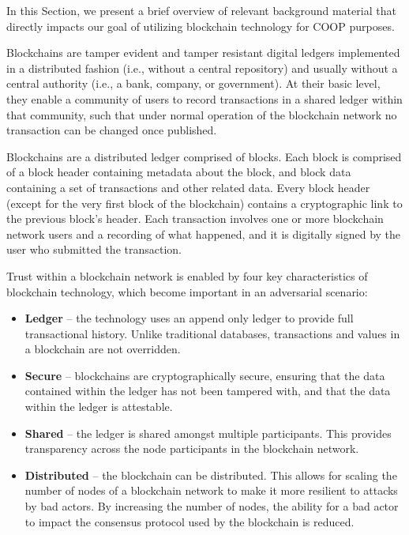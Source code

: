\label{sec:overview}

In this Section, we present a brief overview of relevant background material that directly impacts our goal of utilizing blockchain
technology for COOP purposes.

Blockchains are tamper evident and tamper resistant digital ledgers implemented in a distributed fashion (i.e., without
a central repository) and usually without a central authority (i.e., a bank, company, or government). At their basic
level, they enable a community of users to record transactions in a shared ledger within that community, such that under
normal operation of the blockchain network no transaction can be changed once published.

Blockchains are a distributed ledger comprised of blocks. Each block is comprised of a block header containing metadata
about the block, and block data containing a set of transactions and other related data. Every block header (except for
the very first block of the blockchain) contains a cryptographic link to the previous block’s header. Each transaction
involves one or more blockchain network users and a recording of what happened, and it is digitally signed by the user
who submitted the transaction.

Trust within a blockchain network is enabled by four key characteristics of blockchain technology, which become
important in an adversarial scenario:
\begin{itemize}
\item {\bf Ledger} – the technology uses an append only ledger to provide full transactional history.
Unlike traditional databases, transactions and values in a blockchain are not overridden.
\item {\bf Secure} – blockchains are cryptographically secure, ensuring that the data contained
within the ledger has not been tampered with, and that the data within the ledger is
attestable.
\item {\bf Shared} – the ledger is shared amongst multiple participants. This provides transparency
across the node participants in the blockchain network.
\item {\bf Distributed} – the blockchain can be distributed. This allows for scaling the number of
nodes of a blockchain network to make it more resilient to attacks by bad actors. By
increasing the number of nodes, the ability for a bad actor to impact the consensus
protocol used by the blockchain is reduced.
\end{itemize}

